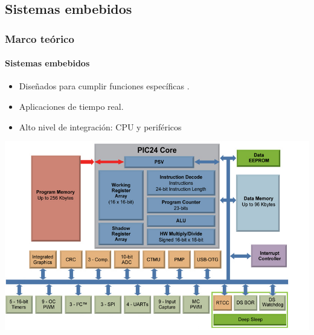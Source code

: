 \documentclass[xcolor=dvipsnames]{beamer}
\begin{document}
    \subsection{Sistemas embebidos}
    \begin{frame}
        \frametitle{Marco teórico}
        \framesubtitle{Sistemas embebidos}
        
        \begin{itemize}
            \item Diseñados para cumplir funciones específicas .
            \item Aplicaciones de tiempo real.
            \item Alto nivel de integración: CPU y periféricos
        \end{itemize}
        
        \vspace{0.5cm}
        \centering
        \includegraphics[scale=0.33]{img/pic_perif.jpg}
        
    \end{frame}
    
\end{document}
